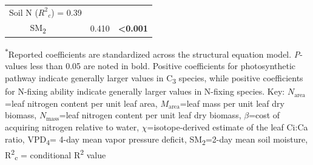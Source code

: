 \begin{table}
\begin{tabular}{p{0.5cm}p{3cm}p{1.5cm}p{1.5cm}}
            \multicolumn{2}{l}{Soil N ($R^2{}_c$) = 0.39} && \\
            & \multicolumn{1}{l}{SM\textsubscript{2}} & \multicolumn{1}{r}{0.410} & \multicolumn{1}{r}{\textbf{<0.001}} \\
            \hline

        \end{tabular}%
        \label{tab:table4.5}
    \end{table}
\begin{singlespace}
    \noindent \textsuperscript{$*$}Reported coefficients are standardized across the structural equation model. \textit{P}-values less than 0.05 are noted in bold. Positive coefficients for photosynthetic pathway indicate generally larger values in C\textsubscript{3} species, while positive coefficients for N-fixing ability indicate generally larger values in N-fixing species. Key: $N_\mathrm{area}$=leaf nitrogen content per unit leaf area, $M_\mathrm{area}$=leaf mass per unit leaf dry biomass, $N_\mathrm{mass}$=leaf nitrogen content per unit leaf dry biomass, $\beta$=cost of acquiring nitrogen relative to water, $\chi$=isotope-derived estimate of the leaf Ci:Ca ratio, VPD\textsubscript{4}= 4-day mean vapor pressure deficit, SM\textsubscript{2}=2-day mean soil moisture, R\textsuperscript{2}\textsubscript{c} = conditional R\textsuperscript{2} value
\end{singlespace}
\clearpage

